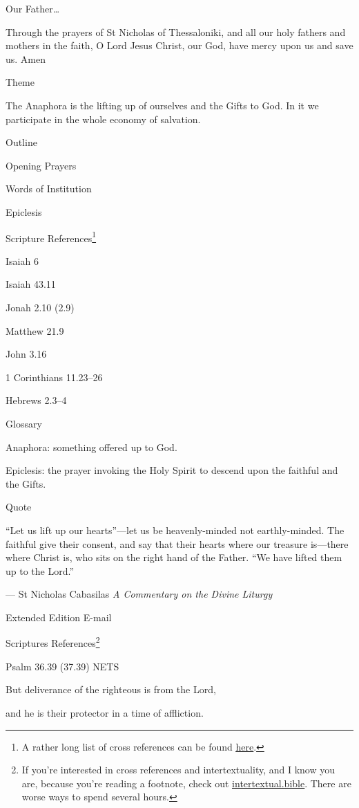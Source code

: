 \documentclass[
]{article}
\begin{document}
Our Father\ldots{}

Through the prayers of St Nicholas of Thessaloniki, and all our holy
fathers and mothers in the faith, O Lord Jesus Christ, our God, have
mercy upon us and save us. Amen

Theme

The Anaphora is the lifting up of ourselves and the Gifts to God. In it
we participate in the whole economy of salvation.

Outline

Opening Prayers

Words of Institution

Epiclesis

Scripture References\footnote{A rather long list of cross references can
  be found
  \href{http://jimmyakin.com/deuterocanonical-references-in-the-new-testament}{\ul{here}}.}

Isaiah 6

Isaiah 43.11

Jonah 2.10 (2.9)

Matthew 21.9

John 3.16

1 Corinthians 11.23--26

Hebrews 2.3--4

Glossary

Anaphora: something offered up to God.

Epiclesis: the prayer invoking the Holy Spirit to descend upon the
faithful and the Gifts.

Quote

``Let us lift up our hearts''---let us be heavenly-minded not
earthly-minded. The faithful give their consent, and say that their
hearts where our treasure is---there where Christ is, who sits on the
right hand of the Father. ``We have lifted them up to the Lord.''

--- St Nicholas Cabasilas \emph{A Commentary on the Divine Liturgy}

Extended Edition E-mail

Scriptures References\footnote{If you're interested in cross references
  and intertextuality, and I know you are, because you're reading a
  footnote, check out
  \href{http://intertextual.bible}{\ul{intertextual.bible}}. There are
  worse ways to spend several hours.}

Psalm 36.39 (37.39) NETS

But deliverance of the righteous is from the Lord,

and he is their protector in a time of affliction.
\end{document}
